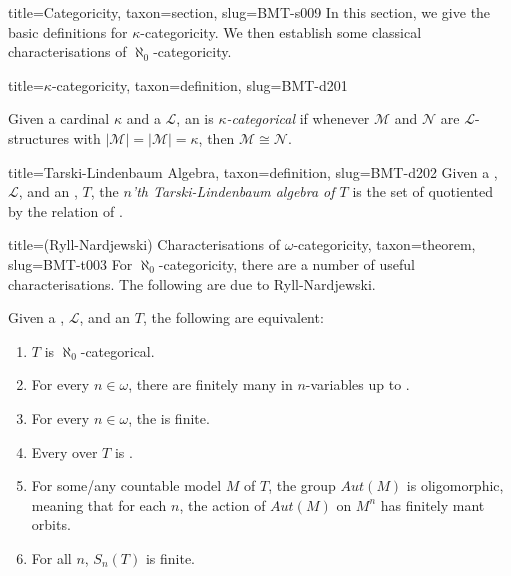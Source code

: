 \documentclass[a4paper]{article}
\begin{document}
\begin{tree}{title={Categoricity}, taxon={section}, slug={BMT-s009}}
In this section, we give the basic definitions for \(\kappa\)-categoricity. We then establish some classical characterisations of \(\aleph _0\)-categoricity.
\begin{tree}{title={\(\kappa\)-categoricity}, taxon={definition}, slug={BMT-d201}}

    Given a cardinal \(\kappa\) and a  \(\mathcal {L}\), an  is \emph{\(\kappa\)-categorical} if whenever \(\mathcal {M}\) and \(\mathcal {N}\) are \(\mathcal {L}\)-structures with \(| \mathcal {M}|=| \mathcal {M}|= \kappa\), then \(\mathcal {M}  \cong   \mathcal {N}\). 

\end{tree}

\begin{tree}{title={Tarski-Lindenbaum Algebra}, taxon={definition}, slug={BMT-d202}}
Given a , \(\mathcal {L}\), and an , \(T\), the \emph{\(n\)'th Tarski-Lindenbaum algebra of \(T\)} is the set of  quotiented by the relation of .
\end{tree}

\begin{tree}{title={(Ryll-Nardjewski) Characterisations of \(\omega\)-categoricity}, taxon={theorem}, slug={BMT-t003}}
For \(\aleph _0\)-categoricity, there are a number of useful characterisations. The following are due to Ryll-Nardjewski.\par{Given a , \(\mathcal {L}\), and an  \(T\), the following are equivalent:}\par{\begin{enumerate}
\item{\(T\) is \(\aleph _0\)-categorical.
    }
   \item{
        For every \(n \in   \omega\), there are finitely many  in \(n\)-variables up to .
   }
    \item{
        For every \(n \in   \omega\), the  is finite. 
    }
    \item{
        Every  over \(T\) is . 
    }
    \item{
        For some/any countable model \(M\) of \(T\), the  group \(Aut(M)\) is oligomorphic, meaning that for each \(n\), the action of \(Aut(M)\) on \(M^n\) has finitely mant orbits.
    }
    \item{
        For all \(n\), \(S_n(T)\) is finite.
    }
\end{enumerate}}
\end{tree}

\end{tree}
\end{document}
